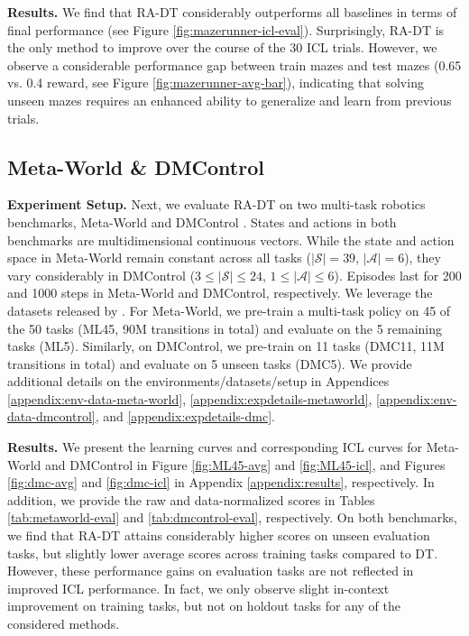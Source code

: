 \documentclass{article} %
\begin{document}
\textbf{Results.}
We find that RA-DT considerably outperforms all baselines in terms of final performance (see Figure \ref{fig:mazerunner-icl-eval}).
Surprisingly, RA-DT is the only method to improve over the course of the 30 ICL trials.
However, we observe a considerable performance gap between train mazes and test mazes (0.65 vs. 0.4 reward, see Figure \ref{fig:mazerunner-avg-bar}), indicating that solving unseen mazes requires an enhanced ability to generalize and learn from previous trials. %
\subsection{Meta-World \& DMControl}\label{sec:exp-robotics}

\textbf{Experiment Setup.}
Next, we evaluate RA-DT on two multi-task robotics benchmarks, Meta-World \citep{Yu:22} and DMControl \citep{Tassa:18}. 
States and actions in both benchmarks are multidimensional continuous vectors.
While the state and action space in Meta-World remain constant across all tasks ($|\mathcal{S}|=39$, $|\mathcal{A}|=6$), they vary considerably in DMControl ($3\leq|\mathcal{S}|\leq 24$, $1\leq|\mathcal{A}|\leq6$).
Episodes last for 200 and 1000 steps in Meta-World and DMControl, respectively.
We leverage the datasets released by \citet{Schmied:23}.
For Meta-World, we pre-train a multi-task policy on 45 of the 50 tasks (ML45, 90M transitions in total) and evaluate on the 5 remaining tasks (ML5).
Similarly, on DMControl, we pre-train on 11 tasks (DMC11, 11M transitions in total) and evaluate on 5 unseen tasks (DMC5).
We provide additional details on the environments/datasets/setup in Appendices \ref{appendix:env-data-meta-world}, \ref{appendix:expdetails-metaworld}, \ref{appendix:env-data-dmcontrol}, and \ref{appendix:expdetails-dmc}. 

\textbf{Results.} 
We present the learning curves and corresponding ICL curves for Meta-World and DMControl in Figure \ref{fig:ML45-avg} and \ref{fig:ML45-icl}, and Figures \ref{fig:dmc-avg} and \ref{fig:dmc-icl} in Appendix \ref{appendix:results}, respectively.
In addition, we provide the raw and data-normalized scores in Tables \ref{tab:metaworld-eval} and \ref{tab:dmcontrol-eval}, respectively. 
On both benchmarks, we find that RA-DT attains %
considerably higher scores on unseen evaluation tasks, but slightly lower average scores across training tasks compared to DT.
However, these performance gains on evaluation tasks are not reflected in improved ICL performance.
In fact, we only observe slight in-context improvement on training tasks, but not on holdout tasks for any of the considered methods.
\end{document}
